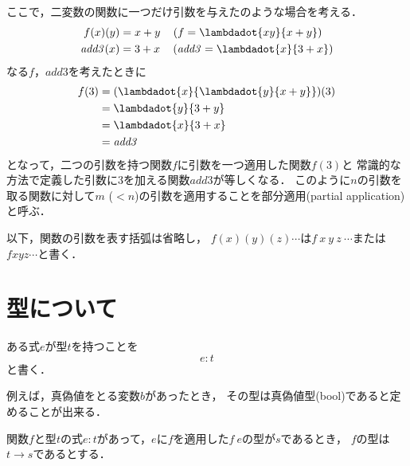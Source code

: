 \documentclass[a4paper,titlepage,report]{jsbook}
\begin{document}
ここで，二変数の関数に一つだけ引数を与えたのような場合を考える．
\begin{align}
f (x)(y) &= x + y \quad \left(f = \lambdadot{xy}{x + y}\right) \\
\mathit{add3}(x)   &= 3 + x \quad \left(\mathit{add3} = \lambdadot{x}{3 + x}\right) 
\end{align}
なる$f$，$\mathit{add3}$を考えたときに
\begin{align}
\begin{aligned}
f(3)            &= (\lambdadot{x}{\lambdadot{y}{x+y}})(3) \\
                &= \lambdadot{y}{3 + y} \\
                &= \lambdadot{x}{3 + x} \\
                &= \mathit{add3}
\end{aligned}
\end{align}
となって，二つの引数を持つ関数$f$に引数を一つ適用した関数$f(3)$と
常識的な方法で定義した引数に3を加える関数$\mathit{add3}$が等しくなる．
このように$n$の引数を取る関数に対して$m$ ($<n$)の引数を適用することを部分適用(partial application)と呼ぶ．

以下，関数の引数を表す括弧は省略し，
$f(x)(y)(z)\cdots$は$f\ x\ y\ z\ \cdots$または$f x y z \cdots$と書く．



\section{型について}\label{sc:about-type}

ある式$e$が型$t$を持つことを
\begin{equation}
e: t
\end{equation}
と書く．

例えば，真偽値をとる変数$b$があったとき，
その型は真偽値型(\textsf{bool})であると定めることが出来る．

関数$f$と型$t$の式$e:t$があって，$e$に$f$を適用した$f\ e$の型が$s$であるとき，
$f$の型は$t\rightarrow s$であるとする．
\end{document}
